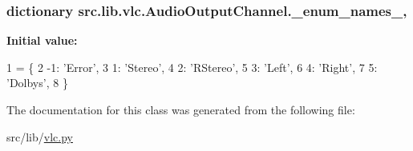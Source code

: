 \subsubsection[{\+\_\+enum\+\_\+names\+\_\+}]{\setlength{\rightskip}{0pt plus 5cm}dictionary src.\+lib.\+vlc.\+Audio\+Output\+Channel.\+\_\+enum\+\_\+names\+\_\+\hspace{0.3cm}{\ttfamily [static]}, {\ttfamily [private]}}\label{classsrc_1_1lib_1_1vlc_1_1AudioOutputChannel_ade28d35cc14a39eefc1054be45624e3e}
{\bfseries Initial value\+:}
\begin{DoxyCode}
1 = \{
2         -1: \textcolor{stringliteral}{'Error'},
3         1: \textcolor{stringliteral}{'Stereo'},
4         2: \textcolor{stringliteral}{'RStereo'},
5         3: \textcolor{stringliteral}{'Left'},
6         4: \textcolor{stringliteral}{'Right'},
7         5: \textcolor{stringliteral}{'Dolbys'},
8     \}
\end{DoxyCode}


The documentation for this class was generated from the following file\+:\begin{DoxyCompactItemize}
\item 
src/lib/\hyperlink{vlc_8py}{vlc.\+py}\end{DoxyCompactItemize}
